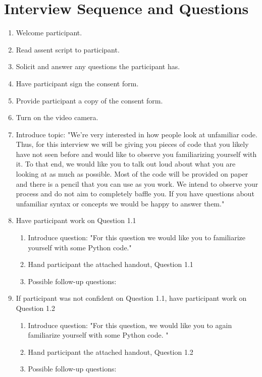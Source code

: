 \documentclass{article}
\begin{document}
\section{Interview Sequence and Questions}
\begin{enumerate}
  \item Welcome participant.
  \item Read assent script to participant.
  \item Solicit and answer any questions the participant has.
  \item Have participant sign the consent form.
  \item Provide participant a copy of the consent form.
  \item Turn on the video camera.
  \item Introduce topic: "We're very interested in how people look at unfamiliar code. Thus, for this interview we will be giving you pieces of code that you likely have not seen before and would like to observe you familiarizing yourself with it. To that end, we would like you to talk out loud about what you are looking at as much as possible. Most of the code will be provided on paper and there is a pencil that you can use as you work. We intend to observe your process and do not aim to completely baffle you. If you have questions about unfamiliar syntax or concepts we would be happy to answer them."
  \item Have participant work on Question 1.1 \\
  \begin{enumerate}
    \item Introduce question: "For this question we would like you to familiarize yourself with some Python code."
    \item Hand participant the attached handout, Question 1.1
    \item Possible follow-up questions:
  \end{enumerate}
  \item If participant was not confident on Question 1.1, have participant work on Question 1.2
   \begin{enumerate}
    \item Introduce question: "For this question, we would like you to again familiarize yourself with some Python code. "
    \item Hand participant the attached handout, Question 1.2
    \item Possible follow-up questions:
  \end{enumerate}

\end{enumerate}
\end{document}
